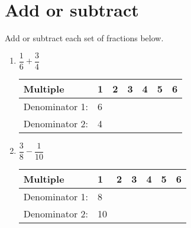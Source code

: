 \documentclass[12pt,letterpaper]{article}
\begin{document}
\section*{Add or subtract}
{Add or subtract each set of fractions below.}

\begin{enumerate}
\item \quad $\dfrac{1}{6} + \dfrac{3}{4}$

\addvspace{0.2in}


\begin{tabular}{p{}|p{}|p{}|p{}|p{}|p{}|p{}}
Multiple & 1 & 2 & 3 & 4 & 5 & 6 \\
\hline
Denominator 1: & 6 &   &   &   &   &   \\
Denominator 2: & 4 &   &   &   &   &   \\
\end{tabular}

\addvspace{0.3in}

\item \quad $\dfrac{3}{8} - \dfrac{1}{10}$

\addvspace{0.2in}

\begin{tabular}{p{}|p{}|p{}|p{}|p{}|p{}|p{}}
Multiple & 1 & 2 & 3 & 4 & 5 & 6 \\
\hline
Denominator 1: & 8 &   &   &   &   &   \\
Denominator 2: & 10 &   &   &   &   &   \\
\end{tabular}

\addvspace{0.3in}

\end{enumerate}
\end{document}
